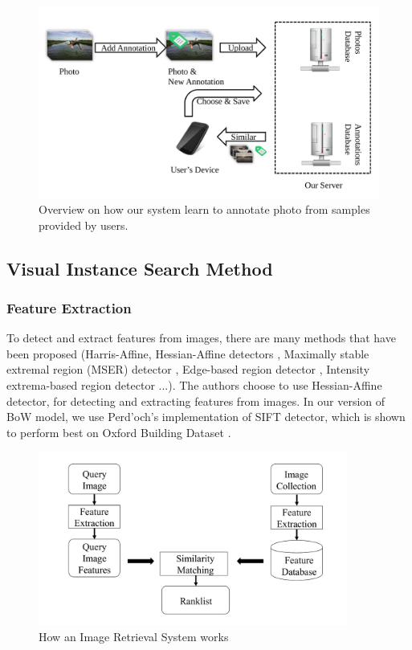 \begin{figure}
    \centering
    \includegraphics[width=5.0in]{flow2.pdf}
    \caption{Overview on how our system learn to annotate photo from samples provided by users.}
    \label{fig:flow_2}
\end{figure}

\subsection{Visual Instance Search Method} \label{section:visual_search}
\subsubsection{Feature Extraction} \label{section:feature_extraction}

To detect and extract features from images, there are many methods that have been proposed (Harris-Affine, Hessian-Affine detectors \cite{Mikolajczyk2004}, Maximally stable extremal region (MSER) detector \cite{conf/bmvc/MatasCUP02}, Edge-based region detector \cite{Tuytelaars99content-basedimage}, Intensity extrema-based region detector \cite{Tuytelaars00widebaseline} ...). The authors choose to use Hessian-Affine detector, for detecting and extracting features from images. In our version of BoW model, we use Perd'och's implementation of SIFT detector, which is shown to perform best on Oxford Building Dataset \cite{perdoch}.

\begin{figure}
    \centering
    \includegraphics[width=4.0in]{ImageRetrievalSystem_fixed.pdf}
    \caption{How an Image Retrieval System works}
    \label{fig:image_retrieval_system}
\end{figure}

